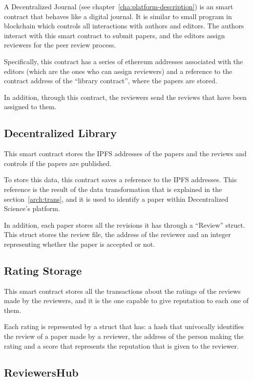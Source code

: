 A Decentralized Journal (see chapter~\ref{cha:platform-description}) is an smart
contract that behaves like a digital journal. It is similar to small program in
blockchain which controls all interactions with authors and editors. The authors
interact with this smart contract to submit papers, and the editors assign
reviewers for the peer review process.

Specifically, this contract has a series of ethereum addresses associated with
the editors (which are the ones who can assign reviewers) and a reference to the
contract address of the ``library contract'', where the papers are stored.

In addition, through this contract, the reviewers send the reviews that have
been assigned to them.

\subsection*{Decentralized Library}
\label{sec:decentr-libr}

This smart contract stores the IPFS addresses of the papers and the reviews and
controls if the papers are published.

To store this data, this contract saves a reference to the IPFS addresses. This
reference is the result of the data transformation that is explained in the
section~\ref{arch:trans}, and it is used to identify a paper within
Decentralized Science's platform.

In addition, each paper stores all the revisions it has through a ``Review''
struct. This struct stores the review file, the address of the reviewer and an
integer representing whether the paper is accepted or not.

\subsection*{Rating Storage}
\label{sec:rating-storage}

This smart contract stores all the transactions about the ratings of the reviews
made by the reviewers, and it is the one capable to give reputation to each one
of them.

Each rating is represented by a struct that has: a hash that univocally
identifies the review of a paper made by a reviewer, the address of the person
making the rating and a score that represents the reputation that is given to
the reviewer.

\subsection*{ReviewersHub}
\label{sec:reviewershub}

